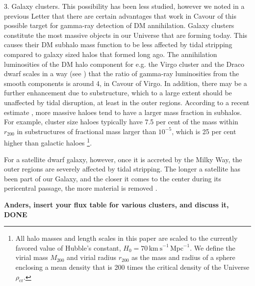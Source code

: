 \documentclass[10pt,aps,pra,reprint,amsmath,amsfonts,amssymb,showpacs,nofootinbib,floatfix]{revtex4-1}
\newcommand{\rmn}{\mathrm}
\newcommand{\rvir}{r_{200}}
\newcommand{\mvir}{M_{200}}
\begin{document}
3. Galaxy clusters. This possibility has been less studied, however we
noted in a previous Letter \cite{2009PhRvL.103r1302P} that there are
certain advantages that work in Cavour of this possible target for
gamma-ray detection of DM annihilation.  Galaxy clusters constitute
the most massive objects in our Universe that are forming today. This
causes their DM subhalo mass function to be less affected by tidal
stripping compared to galaxy sized halos that formed long ago.  The
annihilation luminosities of the DM halo component for e.g. the Virgo
cluster and the Draco dwarf scales in a way (see
\cite{2009PhRvL.103r1302P}) that the ratio of gamma-ray luminosities
from the smooth components is around 4, in Cavour of Virgo. In
addition, there may be a further enhancement due to substructure,
which to a large extent should be unaffected by tidal disruption, at
least in the outer regions.  According to a recent estimate
\cite{2011MNRAS.410.2309G}, more massive haloes tend to have a larger
mass fraction in subhalos.  For example, cluster size haloes typically
have 7.5 per cent of the mass within $r_{200}$ in substructures of
fractional mass larger than $10^{-5}$, which is 25 per cent higher
than galactic haloes \footnote{All halo masses and length scales in
  this paper are scaled to the currently favored value of Hubble's
  constant, $H_0 = 70\, \rmn{km~s}^{-1}\,\rmn{Mpc}^{-1}$. We define
  the virial mass $\mvir$ and virial radius $\rvir$ as the mass and
  radius of a sphere enclosing a mean density that is 200 times the
  critical density of the Universe $\rho_{\rmn{cr}}$.}.

For a satellite dwarf galaxy, however, once it is accreted by the
Milky Way, the outer regions are severely affected by tidal
stripping. The longer a satellite has been part of our Galaxy, and the
closer it comes to the center during its pericentral passage, the more
material is removed \cite{2004MNRAS.355..819G}.

{\bf Anders, insert your flux table for various clusters, and discuss it, DONE}
\end{document}
